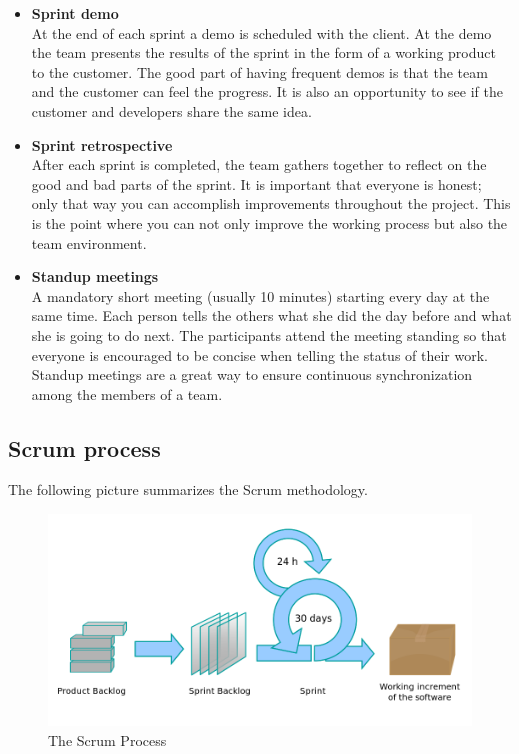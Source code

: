 \begin{itemize}
\item{\textbf{Sprint demo}}\\
At the end of each sprint a demo is scheduled with the client. At the demo the team presents the results of the sprint 
in the form of a working product to the customer. The good part of having frequent demos is that the team and the customer can
feel the progress. It is also an opportunity to see if the customer and developers share the same idea.

\item{\textbf{Sprint retrospective}}\\
After each sprint is completed, the team gathers together to reflect on the good and bad parts of the sprint.
It is important that everyone is honest; only that way you can accomplish improvements throughout the project.
This is the point where you can not only improve the working process but also the team environment.

\item{\textbf{Standup meetings}}\\
A mandatory short meeting (usually 10 minutes) starting every day at the same time.
Each person tells the others what she did the day before and what she is going to do
next. The participants attend the meeting standing so that everyone is encouraged to be concise
when telling the status of their work. Standup meetings are a great way to ensure continuous
synchronization among the members of a team.

\end{itemize}
\pagebreak

\subsection{Scrum process}
The following picture summarizes the Scrum methodology.

\begin{figure}[!h]
\centering
\includegraphics[scale=0.35]{graphics/scrum.png}
\caption{The Scrum Process}\label{fig:scrum_process}
\end{figure}
